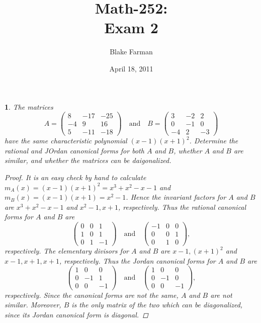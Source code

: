 \documentclass[10pt]{amsart}
\author{Blake Farman}
\title{Math-252:\\Exam 2}
\date{April 18, 2011}
\begin{document}
\maketitle

\newtheorem{thm}{}

\begin{thm}
  \label{Ex1}
  The matrices 
  $$
  A = \begin{pmatrix}
    8 & -17 & -25\\
    -4 & 9 & 16\\
    5 & -11 & -18
  \end{pmatrix}
  \quad \text{and} \quad
  B= \begin{pmatrix}
    3 & -2 & 2\\
    0 & -1 & 0\\
    -4 & 2 & -3
  \end{pmatrix}
  $$
  have the same characteristic polynomial $(x-1)(x+1)^2$.
  Determine the rational and JOrdan canonical forms for both $A$ and $B$, whether $A$ and $B$ are similar, and whether the matrices can be daigonalized.
  \begin{proof}
    It is an easy check by hand to calculate $m_A(x) = (x-1)(x+1)^2 = x^3 + x^2 - x - 1$ and $m_B(x) = (x-1)(x+1) = x^2 - 1$.
    Hence the invariant factors for $A$ and $B$ are $x^3 + x^2 - x - 1$ and $x^2-1, x+1$, respectively.
    Thus the rational canonical forms for $A$ and $B$ are
    $$
    \begin{pmatrix}
      0 & 0  & 1\\
      1 & 0 & 1\\
      0 & 1 & -1
    \end{pmatrix}
    \quad \text{and} \quad
    \begin{pmatrix}
      -1 & 0 & 0\\
      0 & 0 & 1\\
      0 & 1 & 0
    \end{pmatrix},
    $$
    respectively.
    The elementary divisors for $A$ and $B$ are $x-1,(x+1)^2$ and $x-1, x+1, x+1$, respectively.
    Thus the Jordan canonical forms for $A$ and $B$ are 
    $$
    \begin{pmatrix}
      1 & 0 & 0\\
      0 & -1 & 1\\
      0 & 0 & -1
    \end{pmatrix}
    \quad \text{and} \quad
    \begin{pmatrix}
      1 & 0 & 0\\
      0 & -1 & 0\\
      0 & 0 & -1
    \end{pmatrix},
    $$
    respectively.
    Since the canonical forms are not the same, $A$ and $B$ are not similar.
    Moreover, $B$ is the only matrix of the two which can be diagonalized, since its Jordan canonical form is diagonal.
  \end{proof}
\end{thm}
\end{document}
